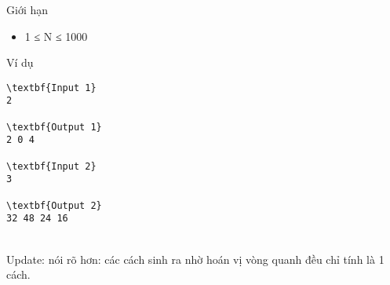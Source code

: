 Giới hạn
\begin{itemize}
	\item 1 ≤ N ≤ 1000
\end{itemize}
Ví dụ
\begin{verbatim}
\textbf{Input 1}
2

\textbf{Output 1}
2 0 4

\textbf{Input 2}
3

\textbf{Output 2}
32 48 24 16 \end{verbatim}


\\Update: nói rõ hơn: các cách sinh ra nhờ hoán vị vòng quanh đều chỉ tính là 1 cách.